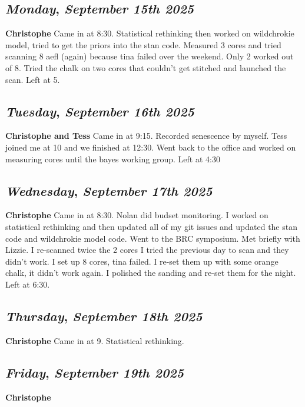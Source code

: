 \def\day{\textit{September 15th 2025}}
\def\weekday{\textit{Monday}}
\subsection*{\weekday, \day}
\textbf {Christophe}
Came in at 8:30. Statistical rethinking then worked on wildchrokie model, tried to get the priors into the stan code. Measured 3 cores and tried scanning 8 aefl (again) because tina failed over the weekend. Only 2 worked out of 8. Tried the chalk on two cores that couldn't get stitched and launched the scan. Left at 5. 

\def\day{\textit{September 16th 2025}}
\def\weekday{\textit{Tuesday}}
\subsection*{\weekday, \day}
\textbf {Christophe and Tess}
Came in at 9:15. Recorded senescence by myself. Tess joined me at 10 and we finished at 12:30. Went back to the office and worked on measuring cores until the bayes working group. Left at 4:30\

\def\day{\textit{September 17th 2025}}
\def\weekday{\textit{Wednesday}}
\subsection*{\weekday, \day}
\textbf {Christophe}
Came in at 8:30. Nolan did budset monitoring. I worked on statistical rethinking and then updated all of my git issues and updated the stan code and wildchrokie model code. Went to the BRC symposium. Met briefly with Lizzie. I re-scanned twice the 2 cores I tried the previous day to scan and they didn't work. I set up 8 cores, tina failed. I re-set them up with some orange chalk, it didn't work again. I polished the sanding and re-set them for the night. Left at 6:30. 

\def\day{\textit{September 18th 2025}}
\def\weekday{\textit{Thursday}}
\subsection*{\weekday, \day}
\textbf {Christophe}
Came in at 9. Statistical rethinking. 

\def\day{\textit{September 19th 2025}}
\def\weekday{\textit{Friday}}
\subsection*{\weekday, \day}
\textbf {Christophe}

